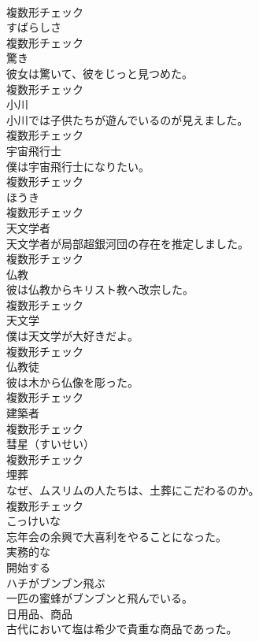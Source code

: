 \documentclass[8pt]{extreport}
\begin{document}
\begin{CJK}{UTF8}{min}
\\	複数形チェック
\\	[名詞]	すばらしさ	
\\	複数形チェック
\\	[名詞]	驚き	
\\	彼女は驚いて、彼をじっと見つめた。	
\\	複数形チェック
\\	[名詞]	小川	
\\	小川では子供たちが遊んでいるのが見えました。	
\\	複数形チェック
\\	[名詞]	宇宙飛行士	
\\	僕は宇宙飛行士になりたい。	
\\	複数形チェック
\\	[名詞]	ほうき	
\\	複数形チェック
\\	[名詞]	天文学者	
\\	天文学者が局部超銀河団の存在を推定しました。	
\\	複数形チェック
\\	[名詞]	仏教	
\\	彼は仏教からキリスト教へ改宗した。	
\\	複数形チェック
\\	[名詞]	天文学	
\\	僕は天文学が大好きだよ。	
\\	複数形チェック
\\	[名詞]	仏教徒	
\\	彼は木から仏像を彫った。	
\\	複数形チェック
\\	[名詞]	建築者	
\\	複数形チェック
\\	[名詞]	彗星（すいせい）	
\\	複数形チェック
\\	[名詞]	埋葬	
\\	なぜ、ムスリムの人たちは、土葬にこだわるのか。	
\\	複数形チェック
\\	[形容詞]	こっけいな	
\\	忘年会の余興で大喜利をやることになった。	
\\	[形容詞]	実務的な	
\\	[動詞]	開始する	
\\	[動詞]	ハチがブンブン飛ぶ	
\\	一匹の蜜蜂がブンブンと飛んでいる。	
\\	[名詞]	日用品、商品	
\\	古代において塩は希少で貴重な商品であった。	

\end{CJK}
\end{document}
